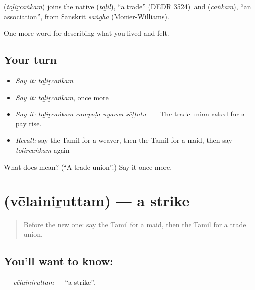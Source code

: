 \begin{cousinweb}
\textbf{} (\emph{toḻiṟcaṅkam}) joins the native  (\emph{toḻil}), \textquotedblleft{}a trade\textquotedblright{} (DEDR 3524), and  (\emph{caṅkam}), \textquotedblleft{}an association\textquotedblright{}, from Sanskrit \emph{saṅgha} (Monier-Williams).
\end{cousinweb}

\begin{grammarlens}[title={What you've built}]
One more word for describing what you lived and felt.
\end{grammarlens}

\subsection*{Your turn}
\begin{itemize}
\raggedright
  \item \emph{Say it:} \emph{toḻiṟcaṅkam}
  \item \emph{Say it:} \emph{toḻiṟcaṅkam}, once more
  \item \emph{Say it:} \emph{toḻiṟcaṅkam campaḷa uyarvu kēṭṭatu.} — The trade union asked for a pay rise.
  \item \emph{Recall:} say the Tamil for a weaver, then the Tamil for a maid, then say \emph{toḻiṟcaṅkam} again
\end{itemize}

\begin{tcolorbox}[breakable,colback=teal!4,colframe=teal!35!black,title={Before you move on}]
What does  mean? (\textquotedblleft{}A trade union\textquotedblright{}.) Say it once more.
\end{tcolorbox}
\section[\texorpdfstring{\ta{வேலைநிறுத்தம்} (vēlainiṟuttam)}{வேலைநிறுத்தம் (vēlainiṟuttam)}]{ (vēlainiṟuttam) — a strike}

\label{lesson:TA-C514-velainiruttam}



\begin{quote}
Before the new one: say the Tamil for a maid, then the Tamil for a trade union.
\end{quote}

\subsection*{You'll want to know: }
\textbf{} — \emph{vēlainiṟuttam} — \textquotedblleft{}a strike\textquotedblright{}.

